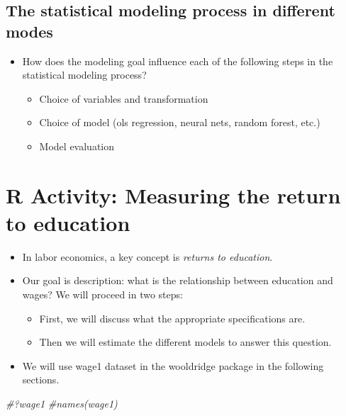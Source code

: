 \documentclass[
]{book}
\newenvironment{Shaded}{\begin{snugshade}}{\end{snugshade}}
\newcommand{\CommentTok}[1]{\textcolor[rgb]{0.56,0.35,0.01}{\textit{#1}}}
\providecommand{\tightlist}{%
  \setlength{\itemsep}{0pt}\setlength{\parskip}{0pt}}
\theoremstyle{definition}
\theoremstyle{definition}
\theoremstyle{definition}
\theoremstyle{definition}
\theoremstyle{remark}
\begin{document}
\hypertarget{the-statistical-modeling-process-in-different-modes}{%
\subsection{The statistical modeling process in different modes}\label{the-statistical-modeling-process-in-different-modes}}

\begin{itemize}
\item
  How does the modeling goal influence each of the following steps in the statistical modeling process?

  \begin{itemize}
  \item
    Choice of variables and transformation
  \item
    Choice of model (ols regression, neural nets, random forest, etc.)
  \item
    Model evaluation
  \end{itemize}
\end{itemize}

\hypertarget{r-activity-measuring-the-return-to-education}{%
\section{R Activity: Measuring the return to education}\label{r-activity-measuring-the-return-to-education}}

\begin{itemize}
\tightlist
\item
  In labor economics, a key concept is \emph{returns to education}.\\
\item
  Our goal is description: what is the relationship between education and wages? We will proceed in two steps:

  \begin{itemize}
  \tightlist
  \item
    First, we will discuss what the appropriate specifications are.
  \item
    Then we will estimate the different models to answer this question.
  \end{itemize}
\item
  We will use wage1 dataset in the wooldridge package in the following sections.
\end{itemize}

\begin{Shaded}
\begin{Highlighting}[]
\CommentTok{\#?wage1}
\CommentTok{\#names(wage1)}
\end{Highlighting}
\end{Shaded}
\end{document}
